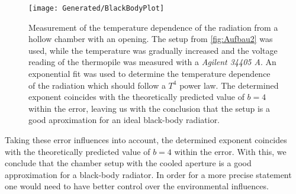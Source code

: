 \documentclass[a4paper,10pt,twocolumn]{article}
\begin{document}
    \begin{figure}
        \begin{center}
            \texttt{[image: Generated/BlackBodyPlot]}
            \caption{Measurement of the temperature dependence of the radiation from a hollow chamber with an opening.
            The setup from \autoref{fig:Aufbau2} was used, while the temperature was gradually increased and the voltage reading of the thermopile
            was measured with a \textit{Agilent 34405 A}.
            An exponential fit was used to determine the temperature dependence of the radiation which should follow a $T^4$ power law.
            The determined exponent coincides with the theoretically predicted value of $b = 4 $ within the error, leaving us with the conclusion that
            the setup is a good aproximation for an ideal black-body radiatior.}
            \label{fig:BlackBodyPlot}
        \end{center}
    \end{figure}
    Taking these error influences into account, the determined exponent coincides with the theoretically predicted value of $b = 4 $ within the error.
    With this, we conclude that the chamber setup with the cooled aperture is a good approximation for a black-body radiator.
    In order for a more precise statement one would need to have better control over the environmental influences. 
    
    
    
    
\end{document}
